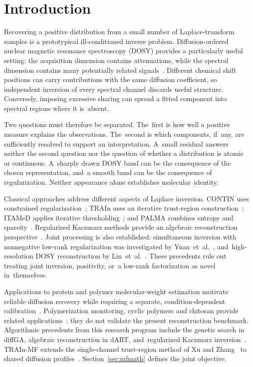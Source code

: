 \documentclass[mathematics,article,accept,moreauthors]{Definitions/mdpi}
\begin{document}
%


\section{Introduction}
Recovering a positive distribution from a small number of Laplace-transform samples is a prototypical ill-conditioned inverse problem. Diffusion-ordered nuclear magnetic resonance spectroscopy (DOSY) provides a particularly useful setting: the acquisition dimension contains attenuations, while the spectral dimension contains many potentially related signals~\cite{stejskal,morris}. Different chemical shift positions can carry contributions with the same diffusion coefficient, so independent inversion of every spectral channel discards useful structure. Conversely, imposing excessive sharing can spread a fitted component into spectral regions where it is~absent.

Two questions must therefore be separated. The~first is how well a positive measure explains the observations. The~second is which components, if~any, are sufficiently resolved to support an interpretation. A~small residual answers neither the second question nor the question of whether a distribution is atomic or continuous. A~sharply drawn DOSY band can be the consequence of the chosen representation, and~a smooth band can be the consequence of regularization. Neither appearance alone establishes molecular~identity.

Classical approaches address different aspects of Laplace inversion. CONTIN uses constrained regularization~\cite{contin}; TRAIn uses an iterative trust-region construction~\cite{train}; ITAMeD applies iterative thresholding~\cite{itamed}; and PALMA combines entropy and sparsity~\cite{palma}. Regularized Kaczmarz methods provide an algebraic reconstruction perspective~\cite{kaczmarz}. Joint processing is also established: simultaneous inversion with nonnegative low-rank regularization was investigated by Yuan~et~al.\ \cite{silt}, and~high-resolution DOSY reconstruction by Lin~et~al.\ \cite{lin}. These precedents rule out treating joint inversion, positivity, or~a low-rank factorization as novel in~themselves.

Applications to protein and polymer molecular-weight estimation motivate reliable diffusion recovery while requiring a separate, condition-dependent calibration~\cite{arrabal2016,protein,concentration}. Polymerization monitoring, cyclic polymers and chitosan provide related applications~\cite{photo2026,cyclic2021,cyclic2023,chitosan2026}; they do not validate the present reconstruction benchmark. Algorithmic precedents from this research program include the genetic search in diffGA, algebraic reconstruction in dART, and~regularized Kaczmarz inversion~\cite{diffga,dart,kaczmarz}. TRAIn-MF extends the single-channel trust-region method of Xu and Zhang~\cite{train} to shared diffusion profiles~\cite{mfv31}. Section~\ref{sec:mfmath} defines the joint objective.
\end{document}

